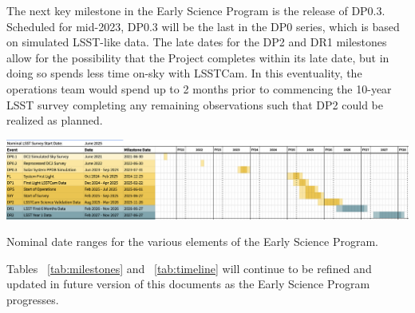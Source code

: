 The next key milestone in the Early Science Program is the release of DP0.3. 
Scheduled for mid-2023, DP0.3 will be the last in the DP0 series, which is based on simulated LSST-like data. 
The late dates for the DP2 and DR1 milestones allow for the possibility that the Project completes within its late date, but in doing so spends less time on-sky with LSSTCam.
In this eventuality, the operations team would spend up to 2 months prior to commencing the 10-year LSST survey completing any remaining observations such that DP2 could be realized as planned.

\begin{table}[ht]
\centering
\includegraphics[width=\linewidth]{figures/DPR-timeline}
\caption{Nominal date ranges for the various elements of the Early Science Program.}
\label{tab:timeline}
\end{table}

Tables ~\ref{tab:milestones} and ~\ref{tab:timeline} will continue to be refined and updated in future version of this documents as the Early Science Program progresses.
